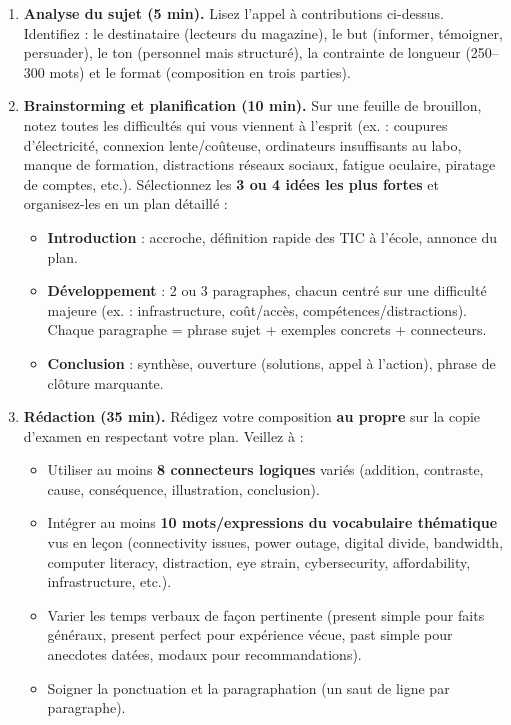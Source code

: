 \documentclass[11pt]{article}
\newcommand{\cle}[1]{{\popxbold\color{popdark}#1}}
\newcounter{popsec}
\newcounter{popsub}
\newcommand{\courssub}[1]{%
  \stepcounter{popsub}%
  \par\vspace{9pt}\noindent{\popxbold\fontsize{11.5}{13}\selectfont\color{popink}{\color{poporange}\thepopsec.\thepopsub}\hspace{6pt}#1}\par\nopagebreak\vspace{4pt}
}
\begin{document}
\courssub{Consignes}
\begin{enumerate}
  \item \textbf{Analyse du sujet (5 min).} Lisez l'appel à contributions ci-dessus. Identifiez : le destinataire (lecteurs du magazine), le but (informer, témoigner, persuader), le ton (personnel mais structuré), la contrainte de longueur (250–300 mots) et le format (composition en trois parties).
  
  \item \textbf{Brainstorming et planification (10 min).} Sur une feuille de brouillon, notez toutes les difficultés qui vous viennent à l'esprit (ex. : coupures d'électricité, connexion lente/coûteuse, ordinateurs insuffisants au labo, manque de formation, distractions réseaux sociaux, fatigue oculaire, piratage de comptes, etc.). Sélectionnez les \textbf{3 ou 4 idées les plus fortes} et organisez-les en un plan détaillé :
  \begin{itemize}
    \item \textbf{Introduction} : accroche, définition rapide des TIC à l'école, annonce du plan.
    \item \textbf{Développement} : 2 ou 3 paragraphes, chacun centré sur une difficulté majeure (ex. : infrastructure, coût/accès, compétences/distractions). Chaque paragraphe = phrase sujet + exemples concrets + connecteurs.
    \item \textbf{Conclusion} : synthèse, ouverture (solutions, appel à l'action), phrase de clôture marquante.
  \end{itemize}
  
  \item \textbf{Rédaction (35 min).} Rédigez votre composition \textbf{au propre} sur la copie d'examen en respectant votre plan. Veillez à :
  \begin{itemize}
    \item Utiliser au moins \textbf{8 connecteurs logiques} variés (addition, contraste, cause, conséquence, illustration, conclusion).
    \item Intégrer au moins \textbf{10 mots/expressions du vocabulaire thématique} vus en leçon (\cle{connectivity issues}, \cle{power outage}, \cle{digital divide}, \cle{bandwidth}, \cle{computer literacy}, \cle{distraction}, \cle{eye strain}, \cle{cybersecurity}, \cle{affordability}, \cle{infrastructure}, etc.).
    \item Varier les temps verbaux de façon pertinente (present simple pour faits généraux, present perfect pour expérience vécue, past simple pour anecdotes datées, modaux pour recommandations).
    \item Soigner la ponctuation et la paragraphation (un saut de ligne par paragraphe).
  \end{itemize}
  

\end{enumerate}
\end{document}
